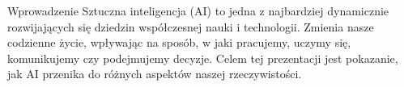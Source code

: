 \begin{frame}{Wprowadzenie}
Sztuczna inteligencja (AI) to jedna z najbardziej dynamicznie rozwijających się dziedzin współczesnej nauki i technologii. Zmienia nasze codzienne życie, wpływając na sposób, w jaki pracujemy, uczymy się, komunikujemy czy podejmujemy decyzje. Celem tej prezentacji jest pokazanie, jak AI przenika do różnych aspektów naszej rzeczywistości.
\end{frame}
